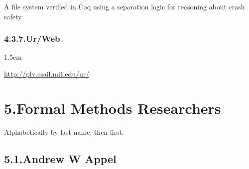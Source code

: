 \documentclass[12pt,twoside]{article}
\begin{document}
\noindent{}A file system verified in Coq using a separation logic for reasoning about crash safety%

\subsubsection{4.3.7.\hspace*{0.5em}Ur/Web}\label{sec-urweb}%

\begin{mddefinitions}%


\begin{mdbmarginx}{}{}{}{1.5em}%
\begin{mddefdata}%
\href{http://plv.csail.mit.edu/ur/}{{\ttfamily http://\hspace{0pt}plv.\hspace{0pt}csail.\hspace{0pt}mit.\hspace{0pt}edu/\hspace{0pt}ur/\hspace{0pt}}}%
\end{mddefdata}%
\end{mdbmarginx}%
\end{mddefinitions}%

\section{5.\hspace*{0.5em}Formal Methods Researchers}\label{sec-formal-methods-researchers}%

\noindent{}Alphabetically by last name, then first.%

\subsection{5.1.\hspace*{0.5em}Andrew W Appel}\label{sec-andrew-w-appel}%
\end{document}
